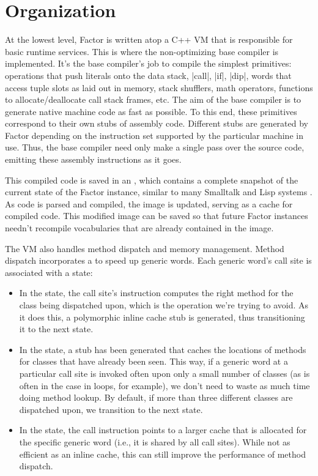 \section{Organization}\label{sec:compiler:vm}

At the lowest level, Factor is written atop a C++ \gls{VM} that is responsible
for basic runtime services.  This is where the non-optimizing base compiler is
implemented.  It's the base compiler's job to compile the simplest primitives:
operations that push literals onto the data stack, \factor|call|, \factor|if|,
\factor|dip|, words that access tuple slots as laid out in memory, stack
shufflers, math operators, functions to allocate/deallocate call stack frames,
etc.  The aim of the base compiler is to generate native machine code as fast
as possible.  To this end, these primitives correspond to their own stubs of
assembly code.  Different stubs are generated by Factor depending on the
instruction set supported by the particular machine in use.  Thus, the base
compiler need only make a single pass over the source code, emitting these
assembly instructions as it goes.

This compiled code is saved in an , which contains a complete
snapshot of the current state of the Factor instance, similar to many Smalltalk
and Lisp systems \autocite{DLS}.  As code is parsed and compiled, the image is
updated, serving as a cache for compiled code.  This modified image can be
saved so that future Factor instances needn't recompile vocabularies that are
already contained in the image.

The \gls{VM} also handles method dispatch and memory management.  Method
dispatch incorporates a  to speed up generic
words.  Each generic word's call site is associated with a state:
\begin{itemize}
  \item In the  state, the call site's instruction computes the
        right method for the class being dispatched upon, which is the
        operation we're trying to avoid.  As it does this, a polymorphic inline
        cache stub is generated, thus transitioning it to the next state.
  \item In the  state, a stub has been generated that caches
        the locations of methods for classes that have already been seen.  This
        way, if a generic word at a particular call site is invoked often upon
        only a small number of classes (as is often in the case in loops, for
        example), we don't need to waste as much time doing method lookup.  By
        default, if more than three different classes are dispatched upon, we
        transition to the next state.
  \item In the  state, the call instruction points to a
        larger cache that is allocated for the specific generic word (i.e., it
        is shared by all call sites).  While not as efficient as an inline
        cache, this can still improve the performance of method dispatch.
\end{itemize}


